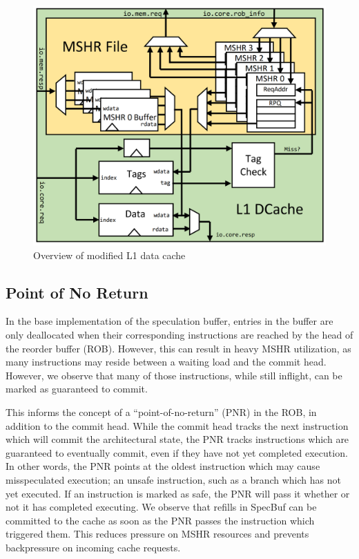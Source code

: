 \begin{figure}[h]
  \begin{center}\includegraphics[scale=0.17]{dcache.png}\end{center}
  \caption{Overview of modified L1 data cache}
\end{figure}

\subsection{Point of No Return} \label{Point of No Return}
In the base implementation of the speculation buffer, entries in the buffer are only deallocated when their corresponding instructions are reached by the head of the reorder buffer (ROB). However, this can result in heavy MSHR utilization, as many instructions may reside between a waiting load and the commit head. However, we observe that many of those instructions, while still inflight, can be marked as guaranteed to commit.

This informs the concept of a ``point-of-no-return'' (PNR) in the ROB, in addition to the commit head. While the commit head tracks the next instruction which will commit the architectural state, the PNR tracks instructions which are guaranteed to eventually commit, even if they have not yet completed execution. In other words, the PNR points at the oldest instruction which may cause misspeculated execution; an unsafe instruction, such as a branch which has not yet executed. If an instruction is marked as safe, the PNR will pass it whether or not it has completed executing. We observe that refills in SpecBuf can be committed to the cache as soon as the PNR passes the instruction which triggered them. This reduces pressure on MSHR resources and prevents backpressure on incoming cache requests.


